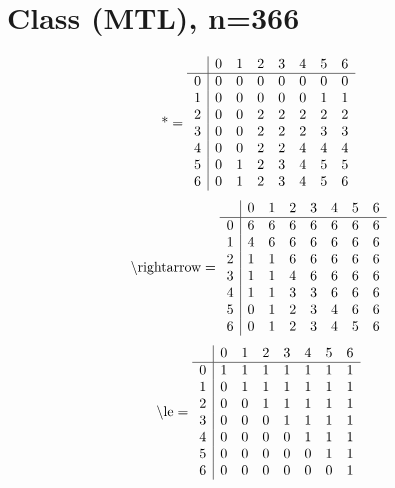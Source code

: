 \documentclass[11pt]{article}
\begin{document}
\section{Class (MTL), n=366}
\[\text{*} = 
\begin{array}{r | r r r r r r r}
 & 0 & 1 & 2 & 3 & 4 & 5 & 6 \\ \hline
0 & 0 & 0 & 0 & 0 & 0 & 0 & 0 \\
1 & 0 & 0 & 0 & 0 & 0 & 1 & 1 \\
2 & 0 & 0 & 2 & 2 & 2 & 2 & 2 \\
3 & 0 & 0 & 2 & 2 & 2 & 3 & 3 \\
4 & 0 & 0 & 2 & 2 & 4 & 4 & 4 \\
5 & 0 & 1 & 2 & 3 & 4 & 5 & 5 \\
6 & 0 & 1 & 2 & 3 & 4 & 5 & 6 \\
\end{array}
\]
\[\text{\textbackslash rightarrow} = 
\begin{array}{r | r r r r r r r}
 & 0 & 1 & 2 & 3 & 4 & 5 & 6 \\ \hline
0 & 6 & 6 & 6 & 6 & 6 & 6 & 6 \\
1 & 4 & 6 & 6 & 6 & 6 & 6 & 6 \\
2 & 1 & 1 & 6 & 6 & 6 & 6 & 6 \\
3 & 1 & 1 & 4 & 6 & 6 & 6 & 6 \\
4 & 1 & 1 & 3 & 3 & 6 & 6 & 6 \\
5 & 0 & 1 & 2 & 3 & 4 & 6 & 6 \\
6 & 0 & 1 & 2 & 3 & 4 & 5 & 6 \\
\end{array}
\]
\[\text{\textbackslash le} = 
\begin{array}{r | r r r r r r r}
 & 0 & 1 & 2 & 3 & 4 & 5 & 6 \\ \hline
0 & 1 & 1 & 1 & 1 & 1 & 1 & 1 \\
1 & 0 & 1 & 1 & 1 & 1 & 1 & 1 \\
2 & 0 & 0 & 1 & 1 & 1 & 1 & 1 \\
3 & 0 & 0 & 0 & 1 & 1 & 1 & 1 \\
4 & 0 & 0 & 0 & 0 & 1 & 1 & 1 \\
5 & 0 & 0 & 0 & 0 & 0 & 1 & 1 \\
6 & 0 & 0 & 0 & 0 & 0 & 0 & 1 \\
\end{array}
\]
\end{document}
